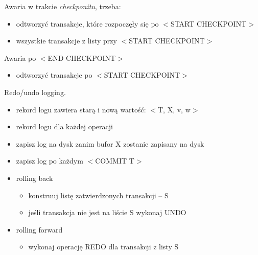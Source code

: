 \documentclass[12pt]{article}
\begin{document}
Awaria w trakcie \emph{checkponitu}, trzeba:
\begin{itemize}
  \item odtworzyć transakcje, które rozpoczęły się po $<$START CHECKPOINT$>$
  \item wszystkie transakcje z listy przy $<$START CHECKPOINT$>$
\end{itemize}

Awaria po $<$END CHECKPOINT$>$
\begin{itemize}
  \item odtworzyć transakcje po $<$START CHECKPOINT$>$
\end{itemize}

%

  Redo/undo logging.
  \begin{itemize}
    \item rekord logu zawiera starą i nową wartość: $<$T, X, v, w$>$
    \item rekord logu dla każdej operacji
    \item zapisz log na dysk zanim bufor X zostanie zapisany na dysk
    \item zapisz log po każdym $<$COMMIT T$>$
  \end{itemize}

  \begin{itemize}
    \item rolling back
    \begin{itemize}
      \item konstruuj listę zatwierdzonych transakcji -- S
      \item jeśli transakcja nie jest na liście S wykonaj UNDO
    \end{itemize}
    \item rolling forward
    \begin{itemize}
      \item wykonaj operację REDO dla transakcji z listy S
    \end{itemize}
  \end{itemize}

\end{document}
